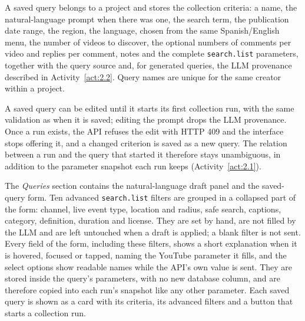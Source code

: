 A saved query belongs to a project and stores the collection criteria: a name, the natural-language prompt when there was one, the search term, the publication date range, the region, the language, chosen from the same Spanish/English menu, the number of videos to discover, the optional numbers of comments per video and replies per comment, notes and the complete \texttt{search.\allowbreak list} parameters, together with the query source and, for generated queries, the LLM provenance described in Activity~\ref{act:2.2}. Query names are unique for the same creator within a project.

A saved query can be edited until it starts its first collection run, with the same validation as when it is saved; editing the prompt drops the LLM provenance. Once a run exists, the API refuses the edit with HTTP 409 and the interface stops offering it, and a changed criterion is saved as a new query. The relation between a run and the query that started it therefore stays unambiguous, in addition to the parameter snapshot each run keeps (Activity~\ref{act:2.1}).

The \emph{Queries} section contains the natural-language draft panel and the saved-query form. Ten advanced \texttt{search.\allowbreak list} filters are grouped in a collapsed part of the form: channel, live event type, location and radius, safe search, captions, category, definition, duration and license. They are set by hand, are not filled by the LLM and are left untouched when a draft is applied; a blank filter is not sent. Every field of the form, including these filters, shows a short explanation when it is hovered, focused or tapped, naming the YouTube parameter it fills, and the select options show readable names while the API's own value is sent. They are stored inside the query's parameters, with no new database column, and are therefore copied into each run's snapshot like any other parameter. Each saved query is shown as a card with its criteria, its advanced filters and a button that starts a collection run.
